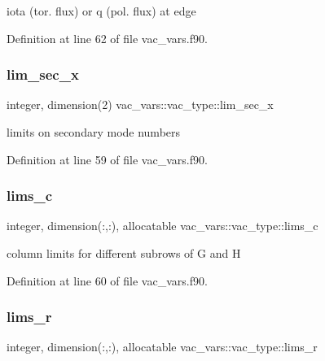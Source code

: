 iota (tor. flux) or q (pol. flux) at edge 



Definition at line 62 of file vac\+\_\+vars.\+f90.

\mbox{\label{structvac__vars_1_1vac__type_a838017f000d61fd3c40edba18b57e558}} 
\subsubsection{\texorpdfstring{lim\+\_\+sec\+\_\+x}{lim\_sec\_x}}
{\footnotesize\ttfamily integer, dimension(2) vac\+\_\+vars\+::vac\+\_\+type\+::lim\+\_\+sec\+\_\+x}



limits on secondary mode numbers 



Definition at line 59 of file vac\+\_\+vars.\+f90.

\mbox{\label{structvac__vars_1_1vac__type_ad4aa76e0d91f32808465d15ac04528ec}} 
\subsubsection{\texorpdfstring{lims\+\_\+c}{lims\_c}}
{\footnotesize\ttfamily integer, dimension(\+:,\+:), allocatable vac\+\_\+vars\+::vac\+\_\+type\+::lims\+\_\+c}



column limits for different subrows of G and H 



Definition at line 60 of file vac\+\_\+vars.\+f90.

\mbox{\label{structvac__vars_1_1vac__type_aac146dc17760b97ff3cb7966cd1b41f9}} 
\subsubsection{\texorpdfstring{lims\+\_\+r}{lims\_r}}
{\footnotesize\ttfamily integer, dimension(\+:,\+:), allocatable vac\+\_\+vars\+::vac\+\_\+type\+::lims\+\_\+r}



